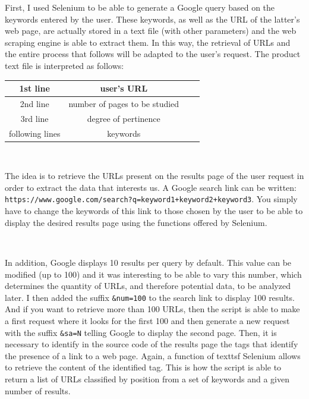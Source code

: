 \documentclass[12pt]{article}
\begin{document}
First, I used \textsf{Selenium} to be able to generate a Google query based on the keywords entered by the user. These keywords, as well as the URL of the latter's web page, are actually stored in a text file (with other parameters) and the web scraping engine is able to extract them. In this way, the retrieval of URLs and the entire process that follows will be adapted to the user's request. The product text file is interpreted as follows: 

\begin{center}
 \begin{tabular}{|c|c|c|c|}
\hline
1st line  & user's URL \\
\hline
2nd line & number of pages to be studied \\
\hline
3rd line & degree of pertinence \\
\hline
following lines & keywords \\
\hline
\end{tabular}
\end{center}

\

The idea is to retrieve the URLs present on the results page of the user request in order to extract the data that interests us. A Google search link can be written: \texttt{https://www.google.com/search?q=keyword1+keyword2+keyword3}. You simply have to change the keywords of this link to those chosen by the user to be able to display the desired results page using the functions offered by \textsf{Selenium}. 

\

In addition, Google displays 10 results per query by default. This value can be modified (up to 100) and it was interesting to be able to vary this number, which determines the quantity of URLs, and therefore potential data, to be analyzed later. I then added the suffix \texttt{\&num=100} to the search link to display 100 results. And if you want to retrieve more than 100 URLs, then the script is able to make a first request where it looks for the first 100 and then generate a new request with the suffix \texttt{\&sa=N} telling Google to display the second page. Then, it is necessary to identify in the source code of the results page the tags that identify the presence of a link to a web page. Again, a function of texttsf{ Selenium} allows to retrieve the content of the identified tag. This is how the script is able to return a list of URLs classified by position from a set of keywords and a given number of results.

\
\end{document}
